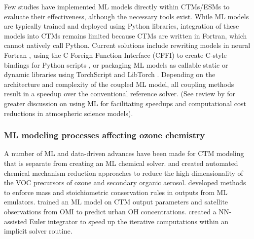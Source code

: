 \documentclass[gmd, manuscript]{copernicus}
\begin{document}
Few studies have implemented ML models directly within CTMs/ESMs to evaluate their effectiveness, although the necessary tools exist. While ML models are typically trained and deployed using Python libraries, integration of these models into CTMs remains limited because CTMs are written in Fortran, which cannot natively call Python. Current solutions include rewriting models in neural Fortran , using the C Foreign Function Interface (CFFI) to create C-style bindings for Python scripts , or packaging ML models as callable static or dynamic libraries using TorchScript and LibTorch \citep{xia_advancing_2024}. Depending on the architecture and complexity of the coupled ML model, all coupling methods result in a speedup over the conventional reference solver. (See review by \citet{de_burgh-day_machine_2023} for greater discussion on using ML for facilitating speedups and computational cost reductions in atmospheric science models). 

\subsubsection{ML modeling processes affecting ozone chemistry}
A number of ML and data-driven advances have been made for CTM modeling that is separate from creating an ML chemical solver. \citet{wiser_amore-isoprene_2023} and \citet{wang_implementation_2023} created automated chemical mechanism reduction approaches to reduce the high dimensionality of the VOC precursors of ozone and secondary organic aerosol. \citet{sturm_conservation_2022} developed methods to enforce mass and stoichiometric conservation rules in outputs from ML emulators. \citet{zhu_combining_2022} trained an ML model on CTM output parameters and satellite observations from OMI to predict urban OH concentrations. \citet{huang_neural_2022} created a NN-assisted Euler integrator to speed up the iterative computations within an implicit solver routine. 
\end{document}
